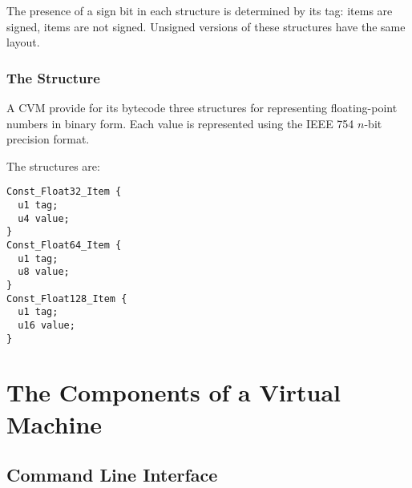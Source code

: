 The presence of a sign bit in each structure is determined by its tag:  items are signed,  items are not signed. Unsigned versions of these structures have the same layout. 





\subsection{The  Structure}

A CVM provide for its bytecode three structures for representing floating-point numbers in binary form. Each value is represented using the IEEE 754 $n$-bit precision format. 

The  structures are:

\begin{minipage}{\linewidth}
\begin{lstlisting}
Const_Float32_Item {
  u1 tag;
  u4 value;
}
Const_Float64_Item {
  u1 tag;
  u8 value;
}
Const_Float128_Item {
  u1 tag;
  u16 value;
}
\end{lstlisting}
\end{minipage}







\chapter{The Components of a Virtual Machine}




\section{Command Line Interface}

